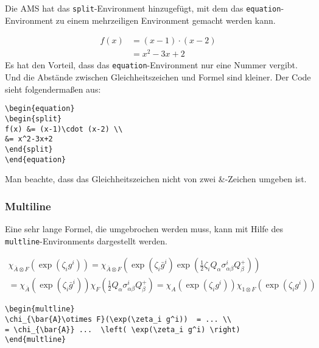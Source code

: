 Die AMS hat das \texttt{split}-Environment hinzugefügt, mit dem das \texttt{equation}-Environment zu einem mehrzeiligen Environment gemacht werden kann.

\begin{equation}
\begin{split}
f(x) &= (x-1)\cdot (x-2) \\
&= x^2-3x+2
\end{split}
\end{equation}
Es hat den Vorteil, dass das \texttt{equation}-Environment nur eine Nummer vergibt. Und die Abstände zwischen Gleichheitszeichen und Formel sind kleiner. Der Code sieht folgendermaßen aus:
\begin{verbatim}
\begin{equation}
\begin{split}
f(x) &= (x-1)\cdot (x-2) \\
&= x^2-3x+2
\end{split}
\end{equation}
\end{verbatim}
Man beachte, dass das Gleichheitszeichen nicht von zwei \&-Zeichen umgeben ist.

\subsubsection{Multiline}

Eine sehr lange Formel, die umgebrochen werden muss, kann mit Hilfe des \texttt{multline}-Environments dargestellt werden.

\begin{multline}\label{eq:chi}
\chi_{\bar{A}\otimes F}(\exp(\zeta_i g^i))  = \chi_{\bar{A}\otimes F}\left( \exp(\zeta_i \bar{g}^i) \exp(\frac{1}{2} \zeta_i Q_\alpha \sigma^i_{\alpha \beta} Q^+_\beta)\right) \\
= \chi_{\bar{A}}\left( \exp(\zeta_i \bar{g}^i) \right) \chi_F \left( \frac{1}{2} Q_\alpha \sigma^i_{\alpha \beta} Q^+_\beta \right)
= \chi_A \left( \exp (\zeta_i g^i) \right) \chi_{1\otimes F} \left( \exp(\zeta_i g^i) \right)
\end{multline}

\begin{verbatim}
\begin{multline}
\chi_{\bar{A}\otimes F}(\exp(\zeta_i g^i))  = ... \\
= \chi_{\bar{A}} ...  \left( \exp(\zeta_i g^i) \right)
\end{multline}
\end{verbatim}

